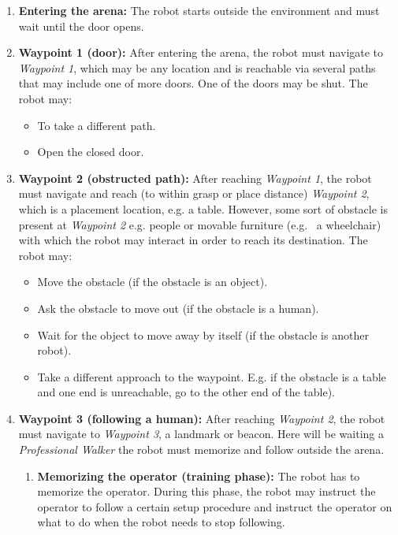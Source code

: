 \begin{enumerate}
	\item \textbf{Entering the arena:} The robot starts outside the environment and must wait until the door opens.

	\item \textbf{Waypoint 1 (door):} After entering the arena, the robot must navigate to \textit{Waypoint 1}, 
	  which may be any location and is reachable via several paths that may include one of more doors.
	One of the doors may be shut. The robot may:
	\begin{itemize}
		\item To take a different path.
		\item Open the closed door.
	\end{itemize}

	\item \textbf{Waypoint 2 (obstructed path):} After reaching \textit{Waypoint 1}, the robot must navigate and reach (to within grasp or place distance) 
	  \textit{Waypoint 2}, which is a placement location, e.g. a table. 
	However, some sort of obstacle is present at \textit{Waypoint 2} e.g. people or movable furniture (e.g.~ a wheelchair) with which the robot may interact in order to reach its destination. 
	The robot may:
	\begin{itemize}
		\item Move the obstacle (if the obstacle is an object).
		\item Ask the obstacle to move out (if the obstacle is a human).
		\item Wait for the object to move away by itself (if the obstacle is another robot).
		\item Take a different approach to the waypoint. E.g. if the obstacle is a table and one end is unreachable, go to the other end of the table). 
	\end{itemize}

	\item \textbf{Waypoint 3 (following a human):} After reaching \textit{Waypoint 2}, the robot must navigate to \textit{Waypoint 3}, a landmark or beacon. 
	Here will be waiting a \textit{Professional Walker} the robot must memorize and follow outside the arena.

	\begin{enumerate}
	\item \textbf{Memorizing the operator (training phase):} The robot has to memorize the operator.
	During this phase, the robot may instruct the operator to follow a certain setup procedure and instruct the operator on what to do when the robot needs to stop following.
	

\end{enumerate}
\end{enumerate}
